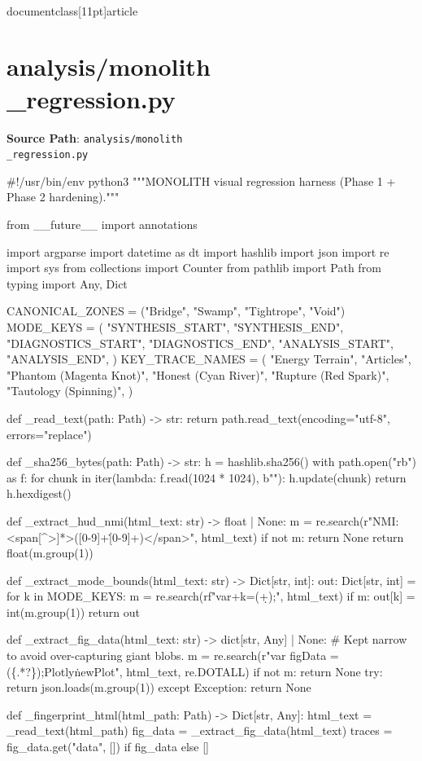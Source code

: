 \\documentclass[11pt]{article}
\begin{document}
\section*{analysis/monolith\\_regression.py}
\textbf{Source Path}: \texttt{analysis/monolith\\_regression.py}\par
\bigskip
\begin{CodeBlock}
#!/usr/bin/env python3
"""MONOLITH visual regression harness (Phase 1 + Phase 2 hardening)."""

from __future__ import annotations

import argparse
import datetime as dt
import hashlib
import json
import re
import sys
from collections import Counter
from pathlib import Path
from typing import Any, Dict


CANONICAL_ZONES = ("Bridge", "Swamp", "Tightrope", "Void")
MODE_KEYS = (
    "SYNTHESIS_START",
    "SYNTHESIS_END",
    "DIAGNOSTICS_START",
    "DIAGNOSTICS_END",
    "ANALYSIS_START",
    "ANALYSIS_END",
)
KEY_TRACE_NAMES = (
    "Energy Terrain",
    "Articles",
    "Phantom (Magenta Knot)",
    "Honest (Cyan River)",
    "Rupture (Red Spark)",
    "Tautology (Spinning)",
)


def _read_text(path: Path) -> str:
    return path.read_text(encoding="utf-8", errors="replace")


def _sha256_bytes(path: Path) -> str:
    h = hashlib.sha256()
    with path.open("rb") as f:
        for chunk in iter(lambda: f.read(1024 * 1024), b""):
            h.update(chunk)
    return h.hexdigest()


def _extract_hud_nmi(html_text: str) -> float | None:
    m = re.search(r"NMI:\s*<span[^>]*>([0-9]+\.[0-9]+)</span>", html_text)
    if not m:
        return None
    return float(m.group(1))


def _extract_mode_bounds(html_text: str) -> Dict[str, int]:
    out: Dict[str, int] = {}
    for k in MODE_KEYS:
        m = re.search(rf"var\s+{k}\s*=\s*(\d+)\s*;", html_text)
        if m:
            out[k] = int(m.group(1))
    return out


def _extract_fig_data(html_text: str) -> dict[str, Any] | None:
    # Kept narrow to avoid over-capturing giant blobs.
    m = re.search(r"var figData = (\{.*?\});\s*Plotly\.newPlot", html_text, re.DOTALL)
    if not m:
        return None
    try:
        return json.loads(m.group(1))
    except Exception:
        return None


def _fingerprint_html(html_path: Path) -> Dict[str, Any]:
    html_text = _read_text(html_path)
    fig_data = _extract_fig_data(html_text)
    traces = fig_data.get("data", []) if fig_data else []


\end{CodeBlock}
\end{document}
